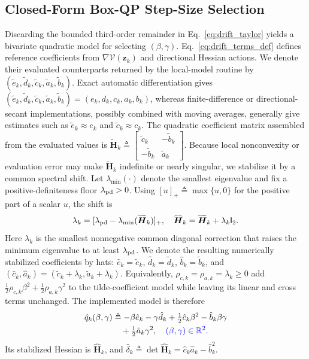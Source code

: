 \documentclass[journal]{IEEEtran}
\theoremstyle{remark}
\newcommand{\R}{\mathbb{R}}
\newcommand{\Id}{\mathsf{I}}
\newcommand{\bz}{\boldsymbol{z}}
\newcommand{\bH}{\boldsymbol{H}}
\newcommand{\Vk}{\mathcal{V}}
\begin{document}
	\subsection{Closed-Form Box-QP Step-Size Selection}\label{subsec:closed_form}
	Discarding the bounded third-order remainder in Eq.~\eqref{eq:drift_taylor} yields a bivariate quadratic model for selecting $(\beta,\gamma)$.
	Eq.~\eqref{eq:drift_terms_def} defines reference coefficients from $\nabla\Vk(\bz_k)$ and directional Hessian actions.
	We denote their evaluated counterparts returned by the local-model routine by $(\tilde e_k,\tilde d_k,\tilde c_k,\tilde a_k,\tilde b_k)$.
	Exact automatic differentiation gives $(\tilde e_k,\tilde d_k,\tilde c_k,\tilde a_k,\tilde b_k)=(e_k,d_k,c_k,a_k,b_k)$, whereas finite-difference or directional-secant implementations, possibly combined with moving averages, generally give estimates such as $\tilde e_k\approx e_k$ and $\tilde c_k\approx c_k$.
	The quadratic coefficient matrix assembled from the evaluated values is $\widetilde{\bH}_k\triangleq\left[\begin{smallmatrix}\tilde c_k&-\tilde b_k\\-\tilde b_k&\tilde a_k\end{smallmatrix}\right]$.
	Because local nonconvexity or evaluation error may make $\widetilde{\bH}_k$ indefinite or nearly singular, we stabilize it by a common spectral shift.
	Let $\lambda_{\min}(\cdot)$ denote the smallest eigenvalue and fix a positive-definiteness floor $\lambda_{\rm pd}>0$.
	Using $[u]_+\triangleq\max\{u,0\}$ for the positive part of a scalar $u$, the shift is
	\begin{equation}\label{eq:spectral_shift}
		\lambda_k=[\lambda_{\rm pd}-\lambda_{\min}(\widetilde{\bH}_k)]_+,
		\quad
		\widehat{\bH}_k=\widetilde{\bH}_k+\lambda_k\Id_2.
	\end{equation}
	Here $\lambda_k$ is the smallest nonnegative common diagonal correction that raises the minimum eigenvalue to at least $\lambda_{\rm pd}$.
	We denote the resulting numerically stabilized coefficients by hats: $\hat e_k=\tilde e_k$, $\hat d_k=\tilde d_k$, $\hat b_k=\tilde b_k$, and $(\hat c_k,\hat a_k)=(\tilde c_k+\lambda_k,\tilde a_k+\lambda_k)$.
	Equivalently, $\rho_{c,k}=\rho_{a,k}=\lambda_k\ge0$ add $\tfrac12\rho_{c,k}\beta^2+\tfrac12\rho_{a,k}\gamma^2$ to the tilde-coefficient model while leaving its linear and cross terms unchanged.
	The implemented model is therefore
	\begin{equation}\label{eq:qhat}
		\begin{aligned}
			\hat q_{k}(\beta,\gamma)
			&\triangleq
			-\beta\hat e_{k}-\gamma\hat d_{k}
			+\tfrac{1}{2}\hat c_{k}\beta^{2}-\hat b_{k}\beta\gamma\\
			&\quad+\tfrac{1}{2}\hat a_{k}\gamma^{2},
			\quad \textcolor{blue}{(\beta,\gamma)\in\R^{2}.}
		\end{aligned}
	\end{equation}
	Its stabilized Hessian is $\widehat{\bH}_k$, and $\hat\delta_k\triangleq\det\widehat{\bH}_k=\hat c_k\hat a_k-\hat b_k^2$.
	
\end{document}
